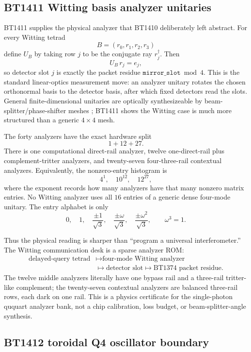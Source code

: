 \documentclass[11pt]{article}
\begin{document}
\subsection{BT1411 Witting basis analyzer unitaries}

BT1411 supplies the physical analyzer that BT1410 deliberately left abstract.
For every Witting tetrad
\[
  B=(r_0,r_1,r_2,r_3)
\]
define \(U_B\) by taking row \(j\) to be the conjugate ray \(r_j^\dagger\).
Then
\[
  U_B\,r_j=e_j,
\]
so detector slot \(j\) is exactly the packet residue
\(\texttt{mirror\_slot}\bmod4\).  This is the standard linear-optics measurement
move: an analyzer unitary rotates the chosen orthonormal basis to the detector
basis, after which fixed detectors read the slots.  General finite-dimensional
unitaries are optically synthesizeable by beam-splitter/phase-shifter meshes
\cite{reck-unitary,clements-multiport}; BT1411 shows the Witting case is much
more structured than a generic \(4\times4\) mesh.

The forty analyzers have the exact hardware split
\[
  1+12+27.
\]
There is one computational direct-rail analyzer, twelve one-direct-rail plus
complement-tritter analyzers, and twenty-seven four-three-rail contextual
analyzers.  Equivalently, the nonzero-entry histogram is
\[
  4^1,\quad 10^{12},\quad 12^{27},
\]
where the exponent records how many analyzers have that many nonzero matrix
entries.  No Witting analyzer uses all \(16\) entries of a generic dense
four-mode unitary.  The entry alphabet is only
\[
  0,\quad 1,\quad
  \frac{\pm1}{\sqrt3},\quad
  \frac{\pm\omega}{\sqrt3},\quad
  \frac{\pm\omega^2}{\sqrt3},
  \qquad \omega^3=1.
\]

Thus the physical reading is sharper than ``program a universal interferometer.''
The Witting communication desk is a sparse analyzer ROM:
\begin{align*}
  \text{delayed-query tetrad}
  &\longmapsto
  \text{four-mode Witting analyzer}\\
  &\longmapsto
  \text{detector slot}
  \longmapsto
  \text{BT1374 packet residue}.
\end{align*}
The twelve middle analyzers literally have one bypass rail and a three-rail
tritter-like complement; the twenty-seven contextual analyzers are balanced
three-rail rows, each dark on one rail.  This is a physics certificate for the
single-photon ququart analyzer bank, not a chip calibration, loss budget, or
beam-splitter-angle synthesis.

\subsection{BT1412 toroidal Q4 oscillator boundary}
\end{document}
